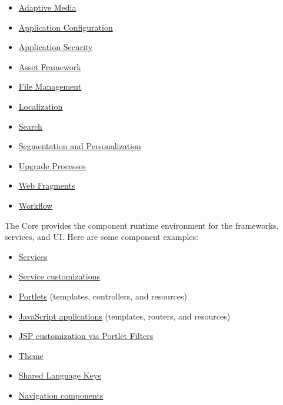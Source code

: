 \begin{itemize}
\tightlist
\item
  \href{/docs/7-2/frameworks/-/knowledge_base/f/adaptive-media}{Adaptive
  Media}
\item
  \href{/docs/7-2/frameworks/-/knowledge_base/f/configurable-applications}{Application
  Configuration}
\item
  \href{/docs/7-2/frameworks/-/knowledge_base/f/application-security}{Application
  Security}
\item
  \href{/docs/7-2/frameworks/-/knowledge_base/f/asset-framework}{Asset
  Framework}
\item
  \href{/docs/7-2/frameworks/-/knowledge_base/f/documents-and-media-api}{File
  Management}
\item
  \href{/docs/7-2/frameworks/-/knowledge_base/f/localization}{Localization}
\item
  \href{/docs/7-2/frameworks/-/knowledge_base/f/search}{Search}
\item
  \href{/docs/7-2/frameworks/-/knowledge_base/f/segmentation-personalization}{Segmentation
  and Personalization}
\item
  \href{/docs/7-2/frameworks/-/knowledge_base/f/upgrade-processes}{Upgrade
  Processes}
\item
  \href{/docs/7-2/frameworks/-/knowledge_base/f/page-fragments}{Web
  Fragments}
\item
  \href{/docs/7-2/frameworks/-/knowledge_base/f/the-workflow-framework}{Workflow}
\end{itemize}

The Core provides the component runtime environment for the frameworks,
services, and UI. Here are some component examples:

\begin{itemize}
\tightlist
\item
  \href{/docs/7-2/appdev/-/knowledge_base/a/service-builder}{Services}
\item
  \href{/docs/7-2/customization/-/knowledge_base/c/overriding-service-builder-services-service-wrappers}{Service
  customizations}
\item
  \href{/docs/7-2/frameworks/-/knowledge_base/f/portlets}{Portlets}
  (templates, controllers, and resources)
\item
  \href{/docs/7-2/appdev/-/knowledge_base/a/web-front-ends}{JavaScript
  applications} (templates, routers, and resources)
\item
  \href{/docs/7-2/customization/-/knowledge_base/c/jsp-overrides-using-portlet-filters}{JSP
  customization via Portlet Filters}
\item
  \href{(/docs/7-2/frameworks/-/knowledge_base/f/themes-introduction)}{Theme}
\item
  \href{/docs/7-2/frameworks/-/knowledge_base/f/creating-a-language-module}{Shared
  Language Keys}
\item
  \href{/docs/7-2/frameworks/-/knowledge_base/f/screen-navigation-framework}{Navigation
  components}
\end{itemize}

